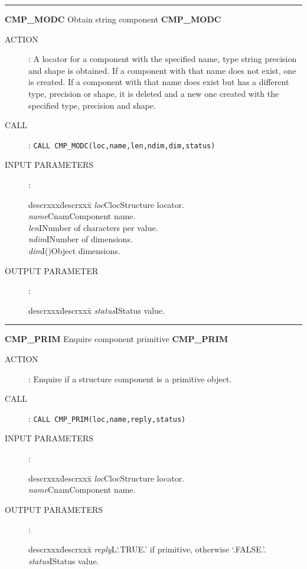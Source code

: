 \goodbreak
\rule{\textwidth}{0.3mm}
{\Large {\bf CMP\_MODC} \hfill Obtain string component \hfill {\bf CMP\_MODC}}
\begin{description}
\item [ACTION]:
A locator for a component with the specified name, type string precision and
shape is obtained.
If a component with that name does not exist, one is created.
If a component with that name does exist but has a different type, precision or
shape, it is deleted and a new one created with the specified type, precision
and shape.
\item [CALL]:
{\tt CALL CMP\_MODC(loc,name,len,ndim,dim,status)}
\item [INPUT PARAMETERS]:
\begin{tabbing}
descrxxx\=descrxxx\=\kill
{\em loc}\>Cloc\>Structure locator.\\
{\em name}\>Cnam\>Component name.\\
{\em len}\>I\>Number of characters per value.\\
{\em ndim}\>I\>Number of dimensions.\\
{\em dim}\>I()\>Object dimensions.
\end{tabbing}
\item [OUTPUT PARAMETER]:
\begin{tabbing}
descrxxx\=descrxxx\=\kill
{\em status}\>I\>Status value.
\end{tabbing}
\end{description}
\goodbreak
\rule{\textwidth}{0.3mm}
{\Large {\bf CMP\_PRIM} \hfill Enquire component primitive \hfill {\bf CMP\_PRIM}}
\begin{description}
\item [ACTION]:
Enquire if a structure component is a primitive object.
\item [CALL]:
{\tt CALL CMP\_PRIM(loc,name,reply,status)}
\item [INPUT PARAMETERS]:
\begin{tabbing}
descrxxx\=descrxxx\=\kill
{\em loc}\>Cloc\>Structure locator.\\
{\em name}\>Cnam\>Component name.
\end{tabbing}
\item [OUTPUT PARAMETERS]:
\begin{tabbing}
descrxxx\=descrxxx\=\kill
{\em reply}\>L\>`.TRUE.' if primitive, otherwise `.FALSE.'.\\
{\em status}\>I\>Status value.
\end{tabbing}
\end{description}
